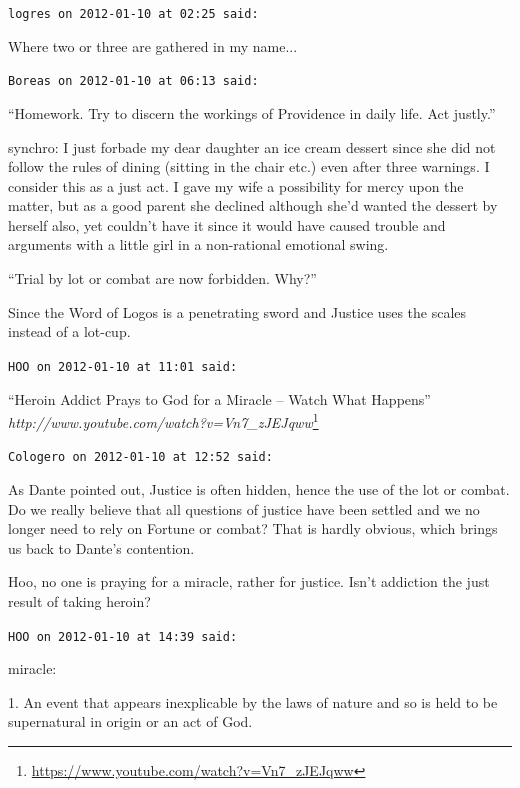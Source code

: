 \begin{footnotesize}
\begin{sffamily}
\texttt{logres on 2012-01-10 at 02:25 said:}

Where two or three are gathered in my name... 

\hfill

\texttt{Boreas on 2012-01-10 at 06:13 said:}

``Homework. Try to discern the workings of Providence in daily life. Act justly.''

synchro: I just forbade my dear daughter an ice cream dessert since she did not follow the rules of dining (sitting in the chair etc.) even after three warnings. I consider this as a just act. I gave my wife a possibility for mercy upon the matter, but as a good parent she declined although she'd wanted the dessert by herself also, yet couldn't have it since it would have caused trouble and arguments with a little girl in a non-rational emotional swing.

``Trial by lot or combat are now forbidden. Why?''

Since the Word of Logos is a penetrating sword and Justice uses the scales instead of a lot-cup.

\hfill

\texttt{HOO on 2012-01-10 at 11:01 said:}

``Heroin Addict Prays to God for a Miracle -- Watch What Happens''\\
\textit{http://www.youtube.com/watch?v=Vn7\_zJEJqww}\footnote{\url{https://www.youtube.com/watch?v=Vn7\_zJEJqww}}


\hfill

\texttt{Cologero on 2012-01-10 at 12:52 said:}

As Dante pointed out, Justice is often hidden, hence the use of the lot or combat. Do we really believe that all questions of justice have been settled and we no longer need to rely on Fortune or combat? That is hardly obvious, which brings us back to Dante's contention.

Hoo, no one is praying for a miracle, rather for justice. Isn't addiction the just result of taking heroin?

\hfill

\texttt{HOO on 2012-01-10 at 14:39 said:}

miracle:

1. An event that appears inexplicable by the laws of nature and so is held to be supernatural in origin or an act of God.


\end{sffamily}
\end{footnotesize}
